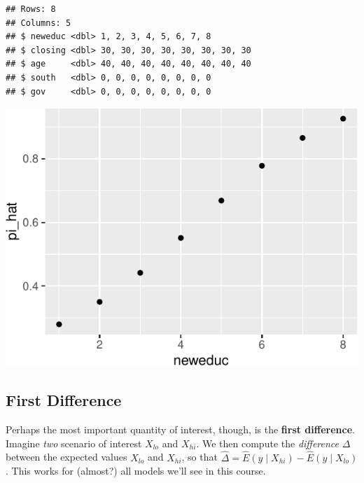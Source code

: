 \documentclass[
]{book}
\newenvironment{Shaded}{\begin{snugshade}}{\end{snugshade}}
\newcommand{\AttributeTok}[1]{\textcolor[rgb]{0.77,0.63,0.00}{#1}}
\newcommand{\FunctionTok}[1]{\textcolor[rgb]{0.00,0.00,0.00}{#1}}
\newcommand{\NormalTok}[1]{#1}
\newcommand{\OtherTok}[1]{\textcolor[rgb]{0.56,0.35,0.01}{#1}}
\newcommand{\SpecialCharTok}[1]{\textcolor[rgb]{0.00,0.00,0.00}{#1}}
\newcommand{\StringTok}[1]{\textcolor[rgb]{0.31,0.60,0.02}{#1}}
\begin{document}
\begin{verbatim}
## Rows: 8
## Columns: 5
## $ neweduc <dbl> 1, 2, 3, 4, 5, 6, 7, 8
## $ closing <dbl> 30, 30, 30, 30, 30, 30, 30, 30
## $ age     <dbl> 40, 40, 40, 40, 40, 40, 40, 40
## $ south   <dbl> 0, 0, 0, 0, 0, 0, 0, 0
## $ gov     <dbl> 0, 0, 0, 0, 0, 0, 0, 0
\end{verbatim}

\begin{Shaded}
\end{Shaded}

\includegraphics{03-05-first-difference_files/figure-latex/unnamed-chunk-4-1.pdf}

\hypertarget{first-difference}{%
\subsection{First Difference}\label{first-difference}}

Perhaps the most important quantity of interest, though, is the \textbf{first difference}. Imagine \emph{two} scenario of interest \(X_{lo}\) and \(X_{hi}\). We then compute the \emph{difference} \(\Delta\) between the expected values \(X_{lo}\) and \(X_{hi}\), so that \(\hat{\Delta} = \hat{E}(y \mid X_{hi}) - \hat{E}(y \mid X_{lo})\). This works for (almost?) all models we'll see in this course.
\end{document}
